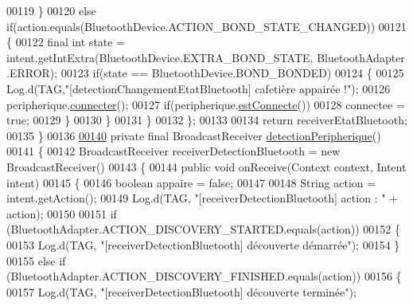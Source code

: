 \begin{DoxyCode}
00119                 \}
00120                 \textcolor{keywordflow}{else} \textcolor{keywordflow}{if}(action.equals(BluetoothDevice.ACTION\_BOND\_STATE\_CHANGED))
00121                 \{
00122                     \textcolor{keyword}{final} \textcolor{keywordtype}{int} state = intent.getIntExtra(BluetoothDevice.EXTRA\_BOND\_STATE, BluetoothAdapter
      .ERROR);
00123                     \textcolor{keywordflow}{if}(state == BluetoothDevice.BOND\_BONDED)
00124                     \{
00125                         Log.d(TAG,\textcolor{stringliteral}{"[detectionChangementEtatBluetooth] cafetière appairée !"});
00126                         peripherique.\hyperlink{classcom_1_1example_1_1ekawa_1_1_peripherique_aeec8c1b360496726a5aecd6c129de81b}{connecter}();
00127                         \textcolor{keywordflow}{if}(peripherique.\hyperlink{classcom_1_1example_1_1ekawa_1_1_peripherique_a963c20e3fba4ed926e9dee972e3b6b39}{estConnecte}())
00128                             connectee = \textcolor{keyword}{true};
00129                     \}
00130                 \}
00131             \}
00132         \};
00133 
00134         \textcolor{keywordflow}{return} receiverEtatBluetooth;
00135     \}
00136 
\hyperlink{classcom_1_1example_1_1ekawa_1_1_communication_a4e46e30e8c22ae617b52260d198a76ca}{00140}     \textcolor{keyword}{private} \textcolor{keyword}{final} BroadcastReceiver \hyperlink{classcom_1_1example_1_1ekawa_1_1_communication_a4e46e30e8c22ae617b52260d198a76ca}{detectionPeripherique}()
00141     \{
00142         BroadcastReceiver receiverDetectionBluetooth = \textcolor{keyword}{new} BroadcastReceiver()
00143         \{
00144             \textcolor{keyword}{public} \textcolor{keywordtype}{void} onReceive(Context context, Intent intent)
00145             \{
00146                 \textcolor{keywordtype}{boolean} appaire = \textcolor{keyword}{false};
00147 
00148                 String action = intent.getAction();
00149                 Log.d(TAG, \textcolor{stringliteral}{"[receiverDetectionBluetooth] action : "} + action);
00150 
00151                 \textcolor{keywordflow}{if} (BluetoothAdapter.ACTION\_DISCOVERY\_STARTED.equals(action))
00152                 \{
00153                     Log.d(TAG, \textcolor{stringliteral}{"[receiverDetectionBluetooth] découverte démarrée"});
00154                 \}
00155                 \textcolor{keywordflow}{else} \textcolor{keywordflow}{if} (BluetoothAdapter.ACTION\_DISCOVERY\_FINISHED.equals(action))
00156                 \{
00157                     Log.d(TAG, \textcolor{stringliteral}{"[receiverDetectionBluetooth] découverte terminée"});

\end{DoxyCode}
